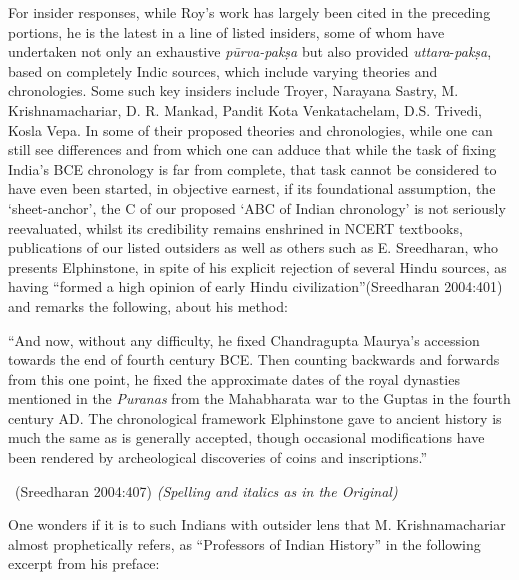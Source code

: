For insider responses, while Roy’s work has largely been cited in the preceding portions, he is the latest in a line of listed insiders, some of whom have undertaken not only an exhaustive \textit{pūrva-pakṣa} but also provided \textit{uttara}-\textit{pakṣa}, based on completely Indic sources, which include varying theories and chronologies. Some such key insiders include Troyer, Narayana Sastry, M. Krishnamachariar, D. R. Mankad, Pandit Kota Venkatachelam, D.S. Trivedi, Kosla Vepa. In some of their proposed theories and chronologies, while one can still see differences and from which one can adduce that while the task of fixing India’s BCE chronology is far from complete, that task cannot be considered to have even been started, in objective earnest, if its foundational assumption, the ‘sheet-anchor’, the C of our proposed ‘ABC of Indian chronology’ is not seriously reevaluated, whilst its credibility remains enshrined in NCERT textbooks, publications of our listed outsiders as well as others such as E. Sreedharan, who presents Elphinstone, in spite of his explicit rejection of several Hindu sources, as having “formed a high opinion of early Hindu civilization”(Sreedharan 2004:401) and remarks the following, about his method:

\begin{myquote}
“And now, without any difficulty, he fixed Chandragupta Maurya’s accession towards the end of fourth century BCE. Then counting backwards and forwards from this one point, he fixed the approximate dates of the royal dynasties mentioned in the \textit{Puranas} from the Mahabharata war to the Guptas in the fourth century AD. The chronological framework Elphinstone gave to ancient history is much the same as is generally accepted, though occasional modifications have been rendered by archeological discoveries of coins and inscriptions.” 

~\hfill (Sreedharan 2004:407) \textit{(Spelling and italics as in the Original)}
\end{myquote}

One wonders if it is to such Indians with outsider lens that M. Krishnamachariar almost prophetically refers, as “Professors of Indian History” in the following excerpt from his preface:

